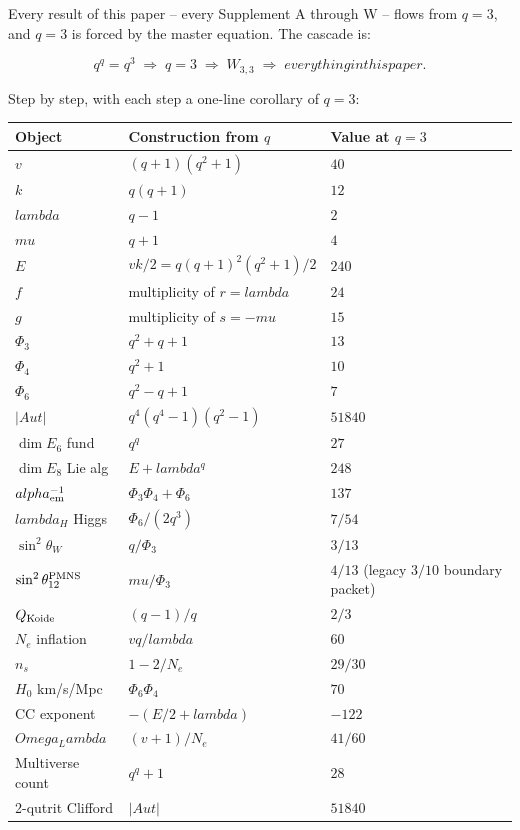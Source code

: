 \documentclass[12pt,a4paper]{article}
\def\mathrm#1{#1}%
\def\text#1{#1}%
\def\alpha{alpha}%
\def\lambda{lambda}%
\def\Lambda{Lambda}%
\def\mu{mu}%
\def\Phi#1{Phi#1}%
\def\Omega{Omega}%
\theoremstyle{definition}
\newcommand{\Aut}{\mathrm{Aut}}
\begin{document}
Every result of this paper -- every Supplement A through W -- flows
from $q=3$, and $q=3$ is forced by the master equation. The cascade
is:

\[
\boxed{\;q^q = q^3 \;\Longrightarrow\; q = 3 \;\Longrightarrow\; W_{3,3} \;\Longrightarrow\;
\text{everything in this paper.}\;}
\]

Step by step, with each step a one-line corollary of $q=3$:

\begin{center}
\renewcommand{\arraystretch}{1.3}
\begin{tabular}{lll}
\toprule
Object & Construction from $q$ & Value at $q=3$ \\
\midrule
$v$  & $(q+1)(q^2+1)$ & $40$ \\
$k$  & $q(q+1)$ & $12$ \\
$\lambda$ & $q-1$ & $2$ \\
$\mu$ & $q+1$ & $4$ \\
$E$  & $vk/2 = q(q+1)^2(q^2+1)/2$ & $240$ \\
$f$  & multiplicity of $r=\lambda$ & $24$ \\
$g$  & multiplicity of $s=-\mu$ & $15$ \\
$\Phi_3$ & $q^2+q+1$ & $13$ \\
$\Phi_4$ & $q^2+1$ & $10$ \\
$\Phi_6$ & $q^2-q+1$ & $7$ \\
$|\Aut|$ & $q^4(q^4-1)(q^2-1)$ & $51840$ \\
$\dim E_6$ fund & $q^q$ & $27$ \\
$\dim E_8$ Lie alg & $E+\lambda^q$ & $248$ \\
$\alpha_{\rm em}^{-1}$ & $\Phi_3\Phi_4+\Phi_6$ & $137$ \\
$\lambda_H$ Higgs & $\Phi_6/(2q^3)$ & $7/54$ \\
$\sin^2\theta_W$ & $q/\Phi_3$ & $3/13$ \\
$\sin^2\theta_{12}^{\rm PMNS}$ & $\mu/\Phi_3$ & $4/13$ (legacy $3/10$ boundary packet) \\
$Q_{\rm Koide}$ & $(q-1)/q$ & $2/3$ \\
$N_e$ inflation & $vq/\lambda$ & $60$ \\
$n_s$ & $1-2/N_e$ & $29/30$ \\
$H_0$ km/s/Mpc & $\Phi_6\Phi_4$ & $70$ \\
CC exponent & $-(E/2+\lambda)$ & $-122$ \\
$\Omega_\Lambda$ & $(v+1)/N_e$ & $41/60$ \\
Multiverse count & $q^q+1$ & $28$ \\
2-qutrit Clifford & $|\Aut|$ & $51840$ \\
\bottomrule
\end{tabular}
\end{center}
\end{document}
